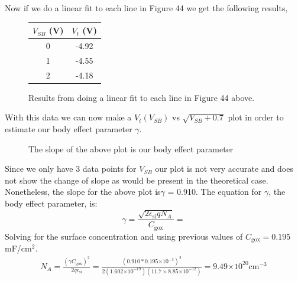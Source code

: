 \documentclass{article}
\providecommand{\e}[1]{\ensuremath{\times 10^{#1}}}
\begin{document}
Now if we do a linear fit to each line in Figure 44 we get the following results,

\begin{figure}[H]
\centering
\begin{tabular}{c || c}
$V_{SB}$ (V) & $V_t$ (V) \\ \hline
0 & -4.92 \\ \hline
1 & -4.55 \\ \hline
2 & -4.18 \\ \hline
\end{tabular}
\caption{Results from doing a linear fit to each line in Figure 44 above.}
\end{figure}

With this data we can now make a $V_t(V_{SB})$ vs $\sqrt{V_{SB} + 0.7}$ plot in order to estimate our body effect parameter $\gamma$.
\begin{figure}[H]
\centering
{}
\caption{The slope of the above plot is our body effect parameter}
\end{figure}
Since we only have 3 data points for $V_{SB}$ our plot is not very accurate and does not show the change of slope as would be present in the theoretical case. Nonetheless, the slope for the above plot is$\gamma$ = 0.910. The equation for $\gamma$, the body effect parameter, is:
\begin{equation}
\gamma = \frac{\sqrt{2\epsilon_{\text{si}} q N_A}}{C_{\text{gox}}} = 
\end{equation}
Solving for the surface concentration and using previous values of $C_{\text{gox}} = 0.195 $mF/${\text{cm}}^2$.
\begin{align*}
N_A = \frac{(\gamma C_{\text{gox}})^2}{2q\epsilon_{\text{si}}} = \frac{(0.910*0.195\e{-3})^2}{2(1.602\e{-19})(11.7\times 8.85\e{-12})} = 9.49\e{20} {\text{cm}}^{-3}
\end{align*}
\end{document}
